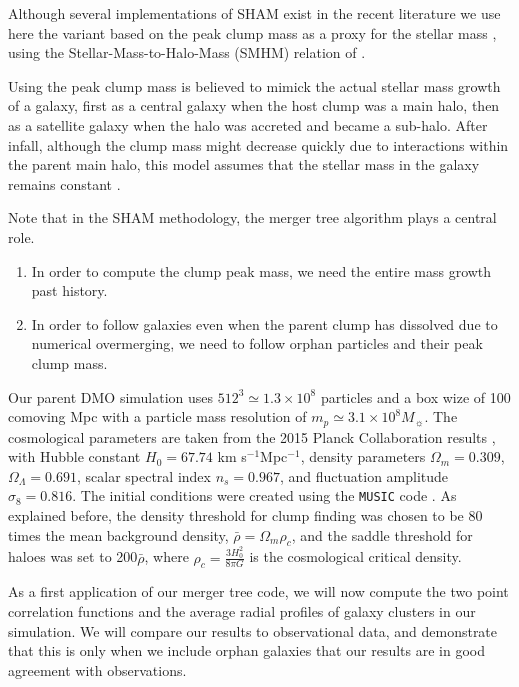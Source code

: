 \documentclass[a4paper,twocolumn,fleqn,usenatbib]{mnras}
\newcommand{\msol}{M_{\sun}}
\begin{document}
Although  several   implementations  of  SHAM  exist   in  the  recent
literature \citep{guoHowGalaxiesPopulate2010, 
wetzelWhatDeterminesSatellite2010, 
Moster2010, trujillo-gomezGalaxiesLCDMHalo2011, 
nuzaClusteringGalaxiesSDSSIII2013,
zentnerGalaxyAssemblyBias2014,
chaves-monteroSubhaloAbundanceMatching2016a} we use here  the variant 
based on the peak clump mass as a proxy for the stellar mass
\citep{reddickConnectionGalaxiesDark2013},          using          the
Stellar-Mass-to-Halo-Mass (SMHM) relation of \cite{Behroozi}.


Using the  peak clump mass  is believed  to mimick the  actual stellar
mass growth of a galaxy, first as a central galaxy when the host clump
was a main halo, then as a satellite galaxy when the halo was accreted
and became  a sub-halo.  After  infall, although the clump  mass might
decrease quickly due to interactions within the parent main halo, this
model assumes  that the  stellar mass in  the galaxy  remains constant
\citep{Nagai}.

Note that in  the SHAM methodology, the merger tree  algorithm plays a
central role.
\begin{enumerate}
\item In order to compute the clump peak mass, we need the entire mass
  growth past history.
\item  In order  to follow  galaxies even  when the  parent clump  has
  dissolved due  to numerical  overmerging, we  need to  follow orphan
  particles and their peak clump mass.
\end{enumerate}

Our parent DMO simulation uses $512^3 \simeq 1.3\times 10^8$ particles
and a box wize of 100 comoving  Mpc with a particle mass resolution of
$m_p \simeq  3.1 \times  10^8\msol$.  The cosmological  parameters are
taken from  the 2015 Planck Collaboration  results \citep{Planck2015},
with  Hubble constant  $H_0  = 67.74$  km s$^{-1}$Mpc$^{-1}$,  density
parameters  $\Omega_m  =  0.309$,  $\Omega_\Lambda  =  0.691$,  scalar
spectral index  $n_s = 0.967$,  and fluctuation amplitude  $\sigma_8 =
0.816$.  The initial conditions  were created using the \texttt{MUSIC}
code \citep{MUSIC}.   As explained  before, the density  threshold for
clump finding was  chosen to be 80 times the  mean background density,
$\bar{\rho} =  \Omega_m \rho_c$, and  the saddle threshold  for haloes
was set to  200$\bar{\rho}$, where $\rho_c = \frac{3  H_0^2}{8 \pi G}$
is the cosmological critical density.

As a  first application of our  merger tree code, we  will now compute
the two point correlation functions and the average radial profiles of
galaxy  clusters in  our simulation.  We will  compare our  results to
observational data, and demonstrate that  this is only when we include
orphan  galaxies  that   our  results  are  in   good  agreement  with
observations.
\end{document}
